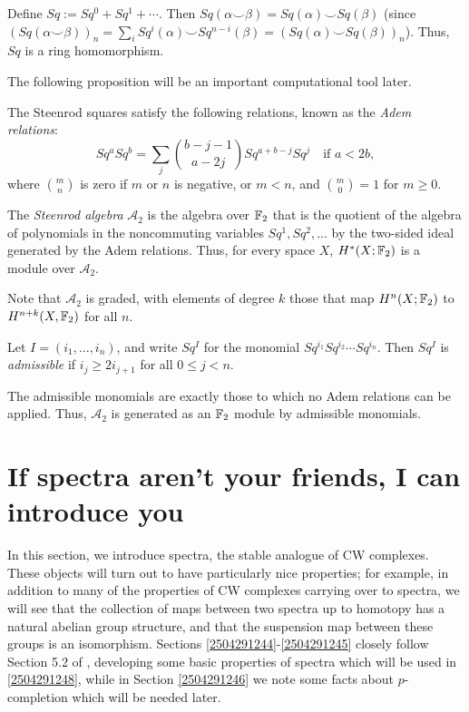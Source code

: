 \documentclass{MetricNotes2023}
\def\bb{\ensuremath\mathbb}
\def\A{\ensuremath{\mathscr{A}_2}}
\begin{document}
Define \(Sq:=Sq^0+Sq^1+\cdots\). Then \(Sq(\alpha\smile \beta)=Sq(\alpha)\smile Sq(\beta)\) (since \((Sq(\alpha\smile \beta))_n=\sum_iSq^i(\alpha)\smile Sq^{n-i}(\beta)=(Sq(\alpha)\smile Sq(\beta))_n\)). Thus, \(Sq\) is a ring homomorphism. 

The following proposition will be an important computational tool later. 

\begin{proposition}\label{2504291153}
The Steenrod squares satisfy the following relations, known as the \textit{Adem relations}:
\[Sq^aSq^b=\sum_j {b-j-1\choose a-2j}Sq^{a+b-j}Sq^j \quad \text{if } a<2b,\]
where \({m \choose n}\) is zero if \(m\) or \(n\) is negative, or \(m<n\), and \({m \choose 0}=1\) for \(m \geq 0\).
\end{proposition}

\begin{definition}
The \textit{Steenrod algebra} \(\mathscr{A}_2\) is the algebra over \(\bb{F}_2\) that is the quotient of the algebra of polynomials in the noncommuting variables \(Sq^1, Sq^2, ...\) by the two-sided ideal generated by the Adem relations. Thus, for every space \(X\), \(H^*(X; \bb{F}_2)\) is a module over \(\mathscr A_2\).
\end{definition}

Note that \(\mathscr A_2\) is graded, with elements of degree \(k\) those that map \(H^n(X; \bb{F}_2)\) to \(H^{n+k}(X, \bb{F}_2)\) for all \(n\). 

\begin{definition}
Let \(I=(i_1, ..., i_n)\), and write \(Sq^I\) for the monomial \(Sq^{i_1}Sq^{i_2}\cdots Sq^{i_n}\). Then \(Sq^I\) is \textit{admissible} if \(i_j\geq 2i_{j+1}\) for all \(0\leq j < n\). 
\end{definition}

The admissible monomials are exactly those to which no Adem relations can be applied. Thus, \(\A\) is generated as an \(\bb{F}_2\) module by admissible monomials. 

\section{If spectra aren't your friends, I can introduce you}

In this section, we introduce spectra, the stable analogue of CW complexes. These objects will turn out to have particularly nice properties; for example, in addition to many of the properties of CW complexes carrying over to spectra, we will see that the collection of maps between two spectra up to homotopy has a natural abelian group structure, and that the suspension map between these groups is an isomorphism. Sections \ref{2504291244}-\ref{2504291245} closely follow Section 5.2 of \autocite{hatcher5}, developing some basic properties of spectra which will be used in \ref{2504291248}, while in Section \ref{2504291246} we note some facts about \(p\)-completion which will be needed later. 
\end{document}
